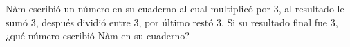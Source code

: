 Nàm escribió un número en su cuaderno al cual multiplicó por $3$, al resultado le sumó $3$, después dividió entre $3$, por último restó 3. Si su resultado final fue $3$, ¿qué número escribió Nàm en su cuaderno?